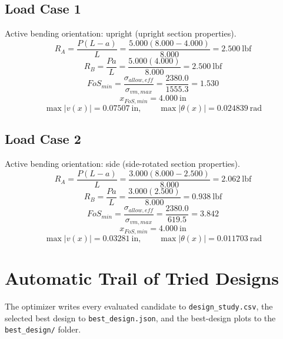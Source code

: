 \documentclass[11pt]{article}
\begin{document}
\subsection*{Load Case 1}
Active bending orientation: upright (upright section properties).
\[R_A = \frac{P(L-a)}{L} = \frac{5.000(8.000-4.000)}{8.000} = 2.500\ \mathrm{lbf}\]
\[R_B = \frac{Pa}{L} = \frac{5.000(4.000)}{8.000} = 2.500\ \mathrm{lbf}\]
\[FoS_{min} = \frac{\sigma_{allow,eff}}{\sigma_{vm,max}} = \frac{2380.0}{1555.3} = 1.530\]
\[x_{FoS,min} = 4.000\ \mathrm{in}\]
\[\max |v(x)| = 0.07507\ \mathrm{in}, \qquad \max |\theta(x)| = 0.024839\ \mathrm{rad}\]
\subsection*{Load Case 2}
Active bending orientation: side (side-rotated section properties).
\[R_A = \frac{P(L-a)}{L} = \frac{3.000(8.000-2.500)}{8.000} = 2.062\ \mathrm{lbf}\]
\[R_B = \frac{Pa}{L} = \frac{3.000(2.500)}{8.000} = 0.938\ \mathrm{lbf}\]
\[FoS_{min} = \frac{\sigma_{allow,eff}}{\sigma_{vm,max}} = \frac{2380.0}{619.5} = 3.842\]
\[x_{FoS,min} = 4.000\ \mathrm{in}\]
\[\max |v(x)| = 0.03281\ \mathrm{in}, \qquad \max |\theta(x)| = 0.011703\ \mathrm{rad}\]

\section*{Automatic Trail of Tried Designs}
The optimizer writes every evaluated candidate to \texttt{design\_study.csv}, the selected best design to \texttt{best\_design.json}, and the best-design plots to the \texttt{best\_design/} folder.
\end{document}
